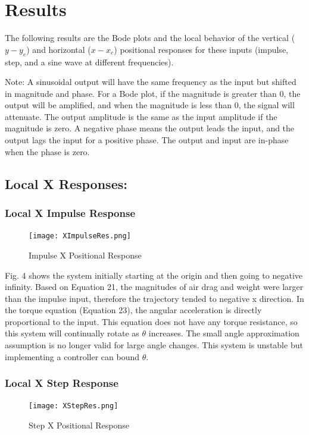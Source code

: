 \documentclass[conference]{IEEEtran}
\begin{document}
\newpage
\section{Results}
The following results are the Bode plots and the local behavior of the vertical ($y - y_e$) and horizontal ($x - x_e$) positional responses for these inputs (impulse, step, and a sine wave at different frequencies). 

Note: A sinusoidal output will have the same frequency as the input but shifted in magnitude and phase. For a Bode plot, if the magnitude is greater than 0, the output will be amplified, and when the magnitude is less than 0, the signal will attenuate. The output amplitude is the same as the input amplitude if the magnitude is zero. A negative phase means the output leads the input, and the output lags the input for a positive phase. The output and input are in-phase when the phase is zero.

\subsection{Local X Responses:}
\subsubsection{Local X Impulse Response} 
\begin{figure}[htbp]
\centering
\centerline{\texttt{[image: XImpulseRes.png]}}
\caption{Impulse X Positional Response}
\label{figure}
\end{figure}


Fig. 4 shows the system initially starting at the origin and then going to negative infinity. Based on Equation 21, the magnitudes of air drag and weight were larger than the impulse input, therefore the trajectory tended to negative x direction. In the torque equation (Equation 23), the angular acceleration is directly proportional to the input. This equation does not have any torque resistance, so this system will continually rotate as $\theta$ increases. The small angle approximation assumption is no longer valid for large angle changes. This system is unstable but implementing a controller can bound $\theta$.

\newpage
\subsubsection{Local X Step Response} 
\begin{figure}[htbp]
\centerline{\texttt{[image: XStepRes.png]}}
\caption{Step X Positional Response}
\label{figure}
\end{figure}
\end{document}
